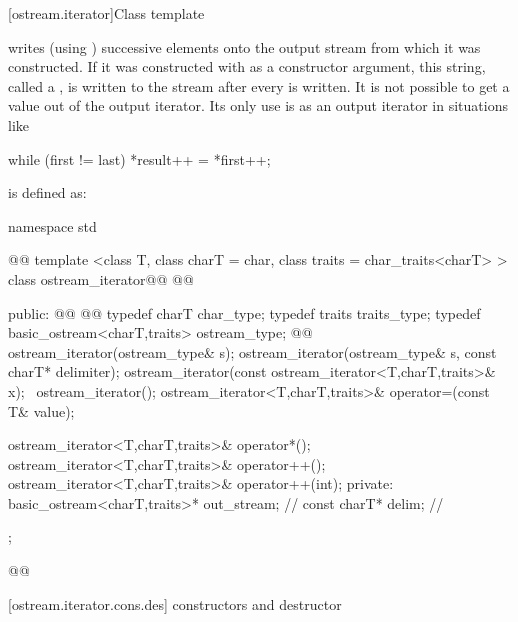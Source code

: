 %
\begin{itemdescr}
\pnum
\returns
{}
\end{itemdescr}

[ostream.iterator]{Class template }

\pnum
{}%
writes (using
)
successive elements onto the output stream from which it was constructed.
If it was constructed with
as a constructor argument, this string, called a
,
is written to the stream after every
is written.
It is not possible to get a value out of the output iterator.
Its only use is as an output iterator in situations like

\begin{codeblock}
while (first != last)
  *result++ = *first++;
\end{codeblock}

\pnum
{}
is defined as:

\begin{codeblock}
namespace std { @@
  template <class T, class charT = char, class traits = char_traits<charT> >
  class ostream_iterator@\removed{:}@
    @@ {
  public:
    @@
    @@
    typedef charT char_type;
    typedef traits traits_type;
    typedef basic_ostream<charT,traits> ostream_type;
    @@
    ostream_iterator(ostream_type& s);
    ostream_iterator(ostream_type& s, const charT* delimiter);
    ostream_iterator(const ostream_iterator<T,charT,traits>& x);
   ~ostream_iterator();
    ostream_iterator<T,charT,traits>& operator=(const T& value);

    ostream_iterator<T,charT,traits>& operator*();
    ostream_iterator<T,charT,traits>& operator++();
    ostream_iterator<T,charT,traits>& operator++(int);
  private:
    basic_ostream<charT,traits>* out_stream;  // \expos
    const charT* delim;                       // \expos
  };
}@\added{\}\}}\newtxt{\}}@
\end{codeblock}

[ostream.iterator.cons.des]{ constructors and destructor}

